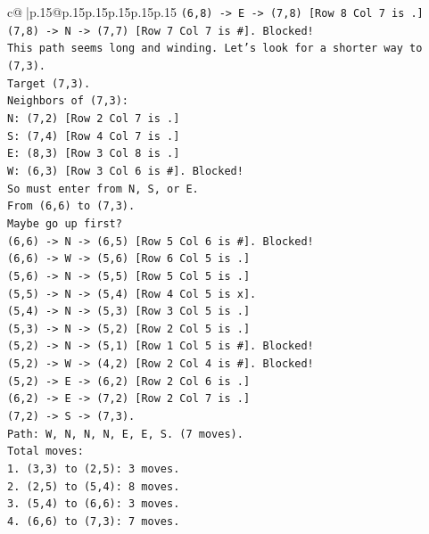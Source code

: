 \documentclass{article}
\begin{document}
{\begin{supertabular}{c@{$\;$}|p{.15\linewidth}@{}p{.15\linewidth}p{.15\linewidth}p{.15\linewidth}p{.15\linewidth}p{.15\linewidth}}
{{{\texttt{(6,8) {-}> E {-}> (7,8) {[}Row 8 Col 7 is .{]}} \\
\texttt{(7,8) {-}> N {-}> (7,7) {[}Row 7 Col 7 is \#{]}. Blocked!} \\
\texttt{This path seems long and winding. Let's look for a shorter way to (7,3).} \\
\texttt{Target (7,3).} \\
\texttt{Neighbors of (7,3):} \\
\texttt{N: (7,2) {[}Row 2 Col 7 is .{]}} \\
\texttt{S: (7,4) {[}Row 4 Col 7 is .{]}} \\
\texttt{E: (8,3) {[}Row 3 Col 8 is .{]}} \\
\texttt{W: (6,3) {[}Row 3 Col 6 is \#{]}. Blocked!} \\
\texttt{So must enter from N, S, or E.} \\
\texttt{From (6,6) to (7,3).} \\
\texttt{Maybe go up first?} \\
\texttt{(6,6) {-}> N {-}> (6,5) {[}Row 5 Col 6 is \#{]}. Blocked!} \\
\texttt{(6,6) {-}> W {-}> (5,6) {[}Row 6 Col 5 is .{]}} \\
\texttt{(5,6) {-}> N {-}> (5,5) {[}Row 5 Col 5 is .{]}} \\
\texttt{(5,5) {-}> N {-}> (5,4) {[}Row 4 Col 5 is x{]}.} \\
\texttt{(5,4) {-}> N {-}> (5,3) {[}Row 3 Col 5 is .{]}} \\
\texttt{(5,3) {-}> N {-}> (5,2) {[}Row 2 Col 5 is .{]}} \\
\texttt{(5,2) {-}> N {-}> (5,1) {[}Row 1 Col 5 is \#{]}. Blocked!} \\
\texttt{(5,2) {-}> W {-}> (4,2) {[}Row 2 Col 4 is \#{]}. Blocked!} \\
\texttt{(5,2) {-}> E {-}> (6,2) {[}Row 2 Col 6 is .{]}} \\
\texttt{(6,2) {-}> E {-}> (7,2) {[}Row 2 Col 7 is .{]}} \\
\texttt{(7,2) {-}> S {-}> (7,3).} \\
\texttt{Path: W, N, N, N, E, E, S. (7 moves).} \\
\texttt{Total moves:} \\
\texttt{1. (3,3) to (2,5): 3 moves.} \\
\texttt{2. (2,5) to (5,4): 8 moves.} \\
\texttt{3. (5,4) to (6,6): 3 moves.} \\
\texttt{4. (6,6) to (7,3): 7 moves.} \\
}}}
\end{supertabular}}
\end{document}
